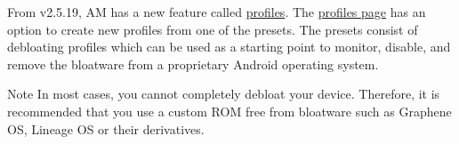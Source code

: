From v2.5.19, AM has a new feature called \hyperref[sec:profile-page]{profiles}. The
\hyperref[sec:profiles-page]{profiles page} has an option to create new profiles from one of the presets. The presets
consist of debloating profiles which can be used as a starting point to monitor, disable, and remove the bloatware from
a proprietary Android operating system.

\begin{warning}{Note}
    In most cases, you cannot completely debloat your device. Therefore, it is recommended that you use a custom ROM
    free from bloatware such as Graphene OS, Lineage OS or their derivatives.
\end{warning}
